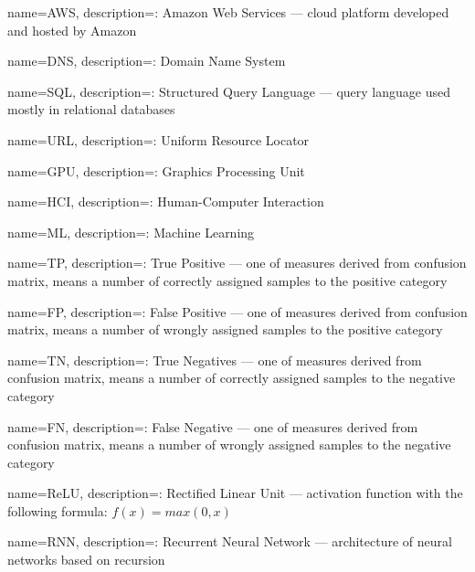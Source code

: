 {
name=AWS,
description={: Amazon Web Services --- cloud platform developed and hosted by Amazon}
}

{
name=DNS,
description={: Domain Name System}
}

{
name=SQL,
description={: Structured Query Language --- query language used mostly in relational databases}
}

{
name=URL,
description={: Uniform Resource Locator}
}

{
name=GPU,
description={: Graphics Processing Unit}
}

{
name=HCI,
description={: Human-Computer Interaction}
}

{
name=ML,
description={: Machine Learning}
}

{
name=TP,
description={: True Positive --- one of measures derived from confusion matrix, means a number of correctly assigned samples to the positive category}
}

{
name=FP,
description={: False Positive --- one of measures derived from confusion matrix, means a number of wrongly assigned samples to the positive category}
}

{
name=TN,
description={: True Negatives --- one of measures derived from confusion matrix, means a number of correctly assigned samples to the negative category}
}

{
name=FN,
description={: False Negative --- one of measures derived from confusion matrix, means a number of wrongly assigned samples to the negative category}
}

{
name=ReLU,
description={: Rectified Linear Unit --- activation function with the following formula: $f(x)=max(0, x)$}
}

{
name=RNN,
description={: Recurrent Neural Network --- architecture of neural networks based on recursion}
}

